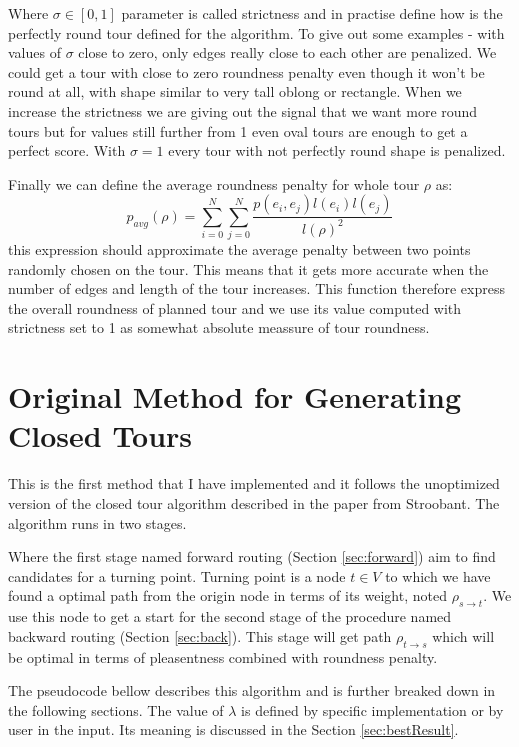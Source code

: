 \documentclass{ctuthesis}
\begin{document}
Where \(\sigma \in [0, 1]\) parameter is called strictness and in practise define how is the perfectly round tour defined for the algorithm. To give out some examples - with values of \(\sigma\) close to zero, only edges really close to each other are penalized. We could get a tour with close to zero roundness penalty even though it won't be round at all, with shape similar to very tall oblong or rectangle. When we increase the strictness we are giving out the signal that we want more round tours but for values still further from 1 even oval tours are enough to get a perfect score. With \(\sigma=1\) every tour with not perfectly round shape is penalized.
\par
Finally we can define the average roundness penalty for whole tour \(\rho\) as:
\begin{equation}
p_{avg}(\rho) = \sum_{i=0}^{N} \sum_{j=0}^{N}\frac{p(e_i, e_j)l(e_i)l(e_j)}{l(\rho)^2}
\end{equation}
this expression should approximate the average penalty between two points randomly chosen on the tour. This means that it gets more accurate when the number of edges and length of the tour increases. This function therefore express the overall roundness of planned tour and we use its value computed with strictness set to 1 as somewhat absolute meassure of tour roundness.


\section{Original Method for Generating Closed Tours}
This is the first method that I have implemented and it follows the unoptimized version of the closed tour algorithm described in the paper from Stroobant\cite{stroobant}. The algorithm runs in two stages. \par
Where the first stage named forward routing (Section \ref{sec:forward}) aim to find candidates for a turning point. Turning point is a node \(t \in V\) to which we have found a optimal path from the origin node in terms of its weight, noted \(\rho_{s \rightarrow t}\). We use this node to get a start for the second stage of the procedure named backward routing (Section \ref{sec:back}). This stage will get path \(\rho_{t \rightarrow s}\) which will be optimal in terms of pleasentness combined with roundness penalty.\par
The pseudocode bellow describes this algorithm and is further breaked down in the following sections. The value of \(\lambda\) is defined by specific implementation or by user in the input. Its meaning is discussed in the Section \ref{sec:bestResult}. 
\end{document}
